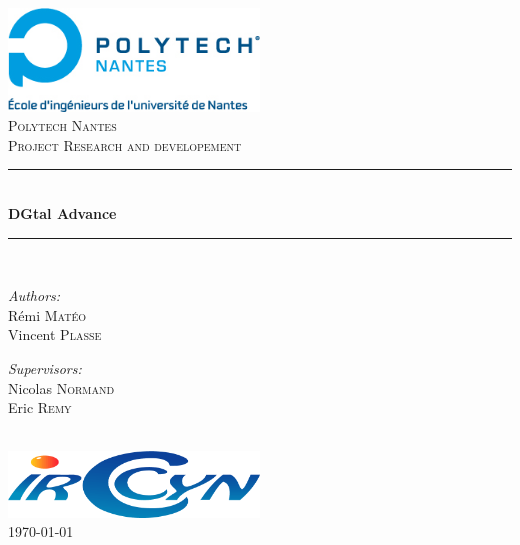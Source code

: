 \documentclass[a4paper,11pt]{report}
\title{\Titre}
\author{\Auteur}
\date{\today}
\newcommand{\HRule}{\rule{\linewidth}{0.5mm}}
\begin{document}
\begin{titlepage}%

\begin{center}
\includegraphics[width=0.5\textwidth]{POLYTECH.jpg} \\[3cm]    

\textsc{\LARGE Polytech Nantes}\\[0.5cm]

\textsc{\Large Project Research and developement}\\[0.5cm]


\HRule \\[0.4cm]
{ \huge \bfseries DGtal Advance}\\[0.4cm]

\HRule \\[1.5cm]

\begin{minipage}{0.4\textwidth}
\begin{flushleft} \large
\emph{Authors:}\\
Rémi \textsc{Matéo}\\
Vincent \textsc{Plasse}
\end{flushleft}
\end{minipage}
\begin{minipage}{0.4\textwidth}
\begin{flushright} \large
\emph{Supervisors:} \\
Nicolas \textsc{Normand}\\
Eric \textsc{Remy}
\end{flushright}
\end{minipage}
\\[3cm]
\includegraphics[width=0.5\textwidth]{irccyn_transparent.png} \\[2cm]    

{\large \today}

\end{center}

\end{titlepage}
\newpage
\tableofcontents
\end{document}
